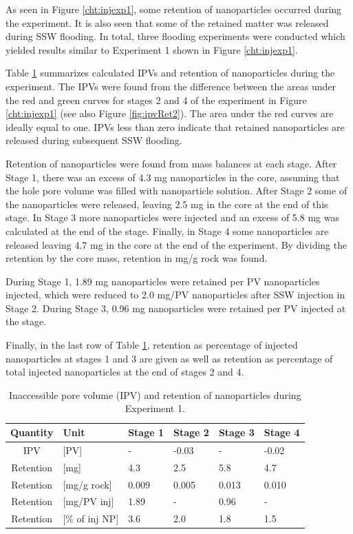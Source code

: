 As seen in Figure \ref{cht:injexp1}, some retention of nanoparticles occurred during the experiment. It is also seen that some of the retained matter was released during SSW flooding. In total, three flooding experiments were conducted which yielded results similar to Experiment 1 shown in Figure \ref{cht:injexp1}.

Table \ref{tab:ipvexp1} summarizes calculated IPVs and retention of nanoparticles during the experiment. The IPVs were found from the difference between the areas under the red and green curves for stages 2 and 4 of the experiment in Figure \ref{cht:injexp1} (see also Figure \ref{fig:ipvRet2}). The area under the red curves are ideally equal to one. IPVs less than zero indicate that retained nanoparticles are released during subsequent SSW flooding.

Retention of nanoparticles were found from mass balances at each stage. After Stage 1, there was an excess of 4.3 mg nanoparticles in the core, assuming that the hole pore volume was filled with nanoparticle solution. After Stage 2 some of the nanoparticles were released, leaving 2.5 mg in the core at the end of this stage. In Stage 3 more nanoparticles were injected and an excess of 5.8 mg was calculated at the end of the stage. Finally, in Stage 4 some nanoparticles are released leaving 4.7 mg in the core at the end of the experiment. By dividing the retention by the core mass, retention in mg/g rock was found.

During Stage 1, 1.89 mg nanoparticles were retained per PV nanoparticles injected, which were reduced to 2.0 mg/PV nanoparticles after SSW injection in Stage 2. During Stage 3, 0.96 mg nanoparticles were retained per PV injected at the stage. 

Finally, in the last row of Table \ref{tab:ipvexp1}, retention as percentage of injected nanoparticles at stages 1 and 3 are given as well as retention as percentage of total injected nanoparticles at the end of stages 2 and 4. 

\begin{table} %
\small
\centering
\caption{Inaccessible pore volume (IPV) and retention of nanoparticles during Experiment 1.}
\label{tab:ipvexp1}
\begin{tabular}{c l l l l l } 
\toprule
\textbf{Quantity} & \textbf{Unit} & \textbf{Stage 1} & \textbf{Stage 2} & \textbf{Stage 3} & \textbf{Stage 4} \\ 
\midrule 
IPV         & [PV]          & -         & -0.03     & -         & -0.02     \\
Retention   & [mg]          & 4.3       & 2.5       & 5.8       & 4.7       \\ 
Retention   & [mg/g rock]   & 0.009     & 0.005     & 0.013     & 0.010     \\ 
Retention   & [mg/PV inj]   & 1.89      & -         & 0.96      & -         \\
Retention   & [\% of inj NP]& 3.6       & 2.0       & 1.8       & 1.5       \\ 
\bottomrule
\end{tabular}
\end{table}

